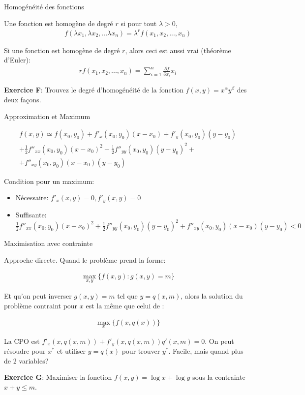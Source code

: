\documentclass[handout]{beamer}
\begin{document}
\begin{frame}{Homogénéité des fonctions}

Une fonction est homogène de degré $r$ si pour tout $\lambda>0$, 
\begin{align*}
f(\lambda x_1, \lambda x_2, ... \lambda x_n) = \lambda^r f(x_1,x_2,...,x_n)
\end{align*}

Si une fonction est homogène de degré $r$, alors ceci est aussi vrai (théorème d'Euler):
\begin{align*}
r f(x_1,x_2,...,x_n) = \sum_{i=1}^n \frac{\partial f}{\partial x_i}x_i
\end{align*}

\textbf{Exercice F}: Trouvez le degré d'homogénéité de la fonction $f(x,y)=x^\alpha y^\beta$ des deux façons.
\end{frame}

\begin{frame}{Approximation et Maximum}

\begin{eqnarray*}
f(x,y) \simeq f(x_0,y_0) + f'_x(x_0,y_0)(x-x_0) + f'_y(x_0,y_0)(y-y_0)  \\
	+\frac{1}{2}f''_{xx}(x_0,y_0)(x-x_0)^2  + \frac{1}{2}f''_{yy}(x_0,y_0)(y-y_0)^2 + \\
	+f''_{xy}(x_0,y_0)(x-x_0)(y-y_0) 
\end{eqnarray*}

Condition pour un maximum: 
\begin{itemize}
\item Nécessaire: $f'_x(x,y)=0, f'_y(x,y)=0$
\item Suffisante: $\frac{1}{2}f''_{xx}(x_0,y_0)(x-x_0)^2  + \frac{1}{2}f''_{yy}(x_0,y_0)(y-y_0)^2 +f''_{xy}(x_0,y_0)(x-x_0)(y-y_0)<0$ 
\end{itemize}

\end{frame}

\begin{frame}{Maximisation avec contrainte}

Approche directe. Quand le problème prend la forme:

\begin{eqnarray}
\max_{x,y} \{ f(x,y): g(x,y)=m\}
\end{eqnarray}

Et qu'on peut inverser $g(x,y)=m$ tel que $y=q(x,m)$, alors la solution du problème contraint pour $x$ est la même que celui de :

\begin{eqnarray}
\max_{x} \{ f(x,q(x))\}
\end{eqnarray}

La CPO est $f'_x(x,q(x,m)) + f'_y(x,q(x,m))q'(x,m) = 0$. On peut résoudre pour $x^*$ et utiliser $y=q(x)$ pour trouver $y^*$. Facile, mais quand plus de 2 variables?

\textbf{Exercice G}: Maximiser la fonction $f(x,y) = \log x + \log y$ sous la contrainte $x+y \le m$.
\end{frame}
\end{document}
